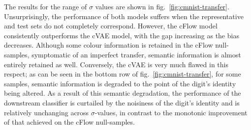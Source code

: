 The results for the range of $\sigma$ values are shown in fig.~\ref{fig:cmnist-transfer}. Unsurprisingly, the performance of both models suffers when the representative and test sets do not completely correspond. However, the cFlow model consistently outperforms the cVAE model, with the gap increasing as the bias decreases.
Although some colour information is retained in the cFlow null-samples, symptomatic of an imperfect transfer, semantic information is almost entirely retained as well.
Conversely, the cVAE is very much flawed in this respect; as can be seen in the bottom row of fig.~\ref{fig:cmnist-transfer}, for some samples, semantic information is degraded to the point of the digit's identity being altered. As a result of this semantic degradation, the performance of the downstream classifier is curtailed by the noisiness of the digit's identity and is relatively unchanging across $\sigma$-values, in contrast to the monotonic improvement of that achieved on the cFlow null-samples.

